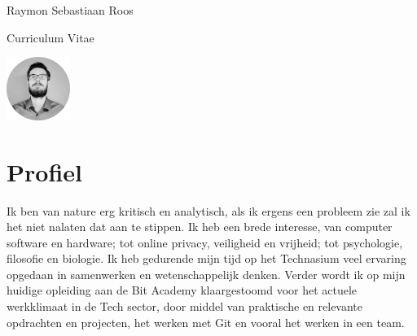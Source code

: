 \documentclass[
	10pt, %
]{FreemanCV}
\begin{document}
\begin{paracol}{2} %


	\parbox[][0.07\textheight][c]{\linewidth}{ %

		\centering %

		{\sffamily\Huge Raymon Sebastiaan Roos} %

		\medskip %

		{\cursivefont\Large\textcolor{headings}{Curriculum Vitae}}

	}


	\begin{center}
		\includegraphics[width=0.155\textwidth]{me_myself.jpg}
	\end{center}

	\section{Profiel}


	Ik ben van nature erg kritisch en analytisch, als ik ergens een
	probleem zie zal ik het niet nalaten dat aan te stippen. Ik heb een
	brede interesse, van computer software en hardware; tot online privacy,
	veiligheid en vrijheid; tot psychologie, filosofie en biologie. Ik heb
	gedurende mijn tijd op het Technasium veel ervaring opgedaan in
	samenwerken en wetenschappelijk denken. Verder wordt ik op mijn huidige
	opleiding aan de Bit Academy klaargestoomd voor het actuele werkklimaat
	in de Tech sector, door middel van praktische en relevante opdrachten
	en projecten, het werken met Git en vooral het werken in een team.


\end{paracol}
\end{document}
